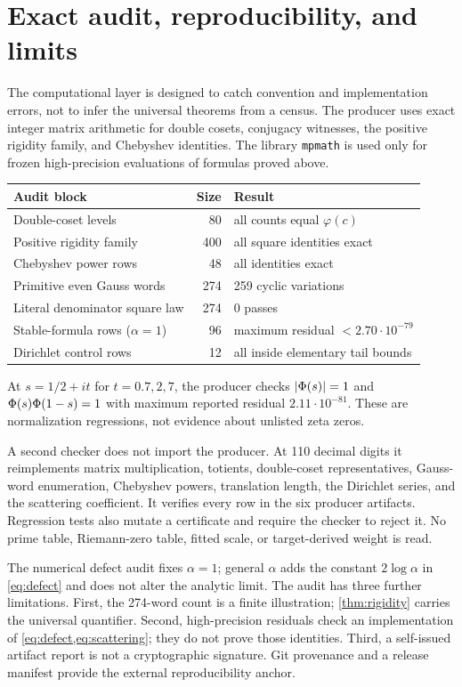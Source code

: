 \section{Exact audit, reproducibility, and limits}

The computational layer is designed to catch convention and implementation
errors, not to infer the universal theorems from a census.  The producer uses
exact integer matrix arithmetic for double cosets, conjugacy witnesses, the
positive rigidity family, and Chebyshev identities.  The library
\texttt{mpmath} is used only for frozen high-precision evaluations of formulas
proved above.

\begin{center}
\begin{tabular}{@{}lrl@{}}
\toprule
Audit block & Size & Result \\
\midrule
Double-coset levels & 80 & all counts equal $\varphi(c)$ \\
Positive rigidity family & 400 & all square identities exact \\
Chebyshev power rows & 48 & all identities exact \\
Primitive even Gauss words & 274 & 259 cyclic variations \\
Literal denominator square law & 274 & 0 passes \\
Stable-formula rows ($\alpha=1$) & 96 & maximum residual $<2.70\cdot10^{-79}$ \\
Dirichlet control rows & 12 & all inside elementary tail bounds \\
\bottomrule
\end{tabular}
\end{center}

At $s=1/2+it$ for $t=0.7,2,7$, the producer checks
$|\Phi(s)|=1$ and $\Phi(s)\Phi(1-s)=1$ with maximum reported residual
$2.11\cdot10^{-81}$.  These are normalization regressions, not evidence about
unlisted zeta zeros.

A second checker does not import the producer.  At 110 decimal digits it
reimplements matrix multiplication, totients, double-coset representatives,
Gauss-word enumeration, Chebyshev powers, translation length, the Dirichlet
series, and the scattering coefficient.  It verifies every row in the six
producer artifacts.  Regression tests also mutate a certificate and require
the checker to reject it.  No prime table, Riemann-zero table, fitted scale, or
target-derived weight is read.

The numerical defect audit fixes $\alpha=1$; general $\alpha$ adds the constant
$2\log\alpha$ in \cref{eq:defect} and does not alter the analytic limit.  The
audit has three further limitations.  First, the 274-word count is a
finite illustration; \cref{thm:rigidity} carries the universal quantifier.
Second, high-precision residuals check an implementation of
\cref{eq:defect,eq:scattering}; they do not prove those identities.  Third, a
self-issued artifact report is not a cryptographic signature.  Git provenance
and a release manifest provide the external reproducibility anchor.

